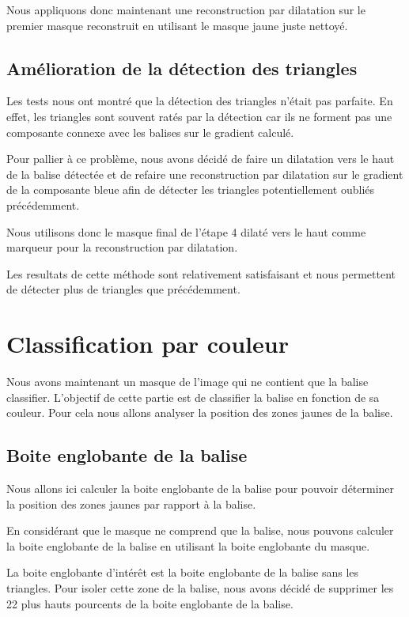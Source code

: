 \documentclass{article}
\begin{document}
Nous appliquons donc maintenant une reconstruction par dilatation sur le
premier masque reconstruit en utilisant le masque jaune juste nettoyé.

\subsection{Amélioration de la détection des triangles}

Les tests nous ont montré que la détection des triangles n'était pas parfaite.
En effet, les triangles sont souvent ratés par la détection car ils ne forment
pas une composante connexe avec les balises sur le gradient calculé.

Pour pallier à ce problème, nous avons décidé de faire un dilatation vers le
haut de la balise détectée et de refaire une reconstruction par dilatation sur
le gradient de la composante bleue afin de détecter les triangles
potentiellement oubliés précédemment.

Nous utilisons donc le masque final de l'étape 4 dilaté vers le haut comme
marqueur pour la reconstruction par dilatation.

Les resultats de cette méthode sont relativement satisfaisant et nous
permettent de détecter plus de triangles que précédemment.

\section{Classification par couleur}

Nous avons maintenant un masque de l'image qui ne contient que la balise
classifier. L'objectif de cette partie est de classifier la balise en fonction
de sa couleur. Pour cela nous allons analyser la position des zones jaunes de
la balise.

\subsection{Boite englobante de la balise}

Nous allons ici calculer la boite englobante de la balise pour pouvoir
déterminer la position des zones jaunes par rapport à la balise.

En considérant que le masque ne comprend que la balise, nous pouvons calculer
la boite englobante de la balise en utilisant la boite englobante du masque.

La boite englobante d'intérêt est la boite englobante de la balise sans les
triangles. Pour isoler cette zone de la balise, nous avons décidé de supprimer
les 22 plus hauts pourcents de la boite englobante de la balise.
\end{document}
